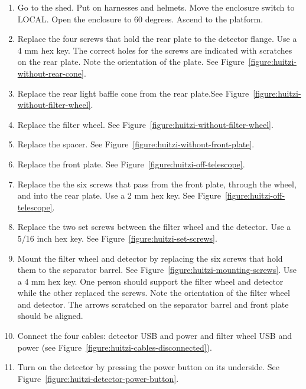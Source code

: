 \begin{enumerate}

    \item Go to the shed. Put on harnesses and helmets. Move the enclosure switch to LOCAL. Open the enclosure to 60 degrees. Ascend to the platform.

    \item Replace the four screws that hold the rear plate to the detector flange. Use a 4 mm hex key. The correct holes for the screws are indicated with scratches on the rear plate. Note the orientation of the plate. See Figure~\ref{figure:huitzi-without-rear-cone}.

    \item Replace the rear light baffle cone from the rear plate.See Figure~\ref{figure:huitzi-without-filter-wheel}. 

    \item Replace the filter wheel. See Figure~\ref{figure:huitzi-without-filter-wheel}.

    \item Replace the spacer. See Figure~\ref{figure:huitzi-without-front-plate}.
    
    \item Replace the front plate. See Figure~\ref{figure:huitzi-off-telescope}.
    
    \item Replace the the six screws that pass from the front plate, through the wheel, and into the rear plate. Use a 2 mm hex key. See Figure~\ref{figure:huitzi-off-telescope}.

    \item Replace the two set screws between the filter wheel and the detector. Use a 5/16 inch hex key. See Figure~\ref{figure:huitzi-set-screws}.

    \item Mount the filter wheel and detector by replacing the six screws that hold them to the separator barrel. See Figure~\ref{figure:huitzi-mounting-screws}. Use a 4 mm hex key. One person should support the filter wheel and detector while the other replaced the screws. Note the orientation of the filter wheel and detector. The arrows scratched on the separator barrel and front plate should be aligned.

   \item Connect the four cables: detector USB and power and filter wheel USB and power (see Figure~\ref{figure:huitzi-cables-disconnected}).

   \item Turn on the detector by pressing the power button on its underside. See Figure~\ref{figure:huitzi-detector-power-button}.

\end{enumerate}

